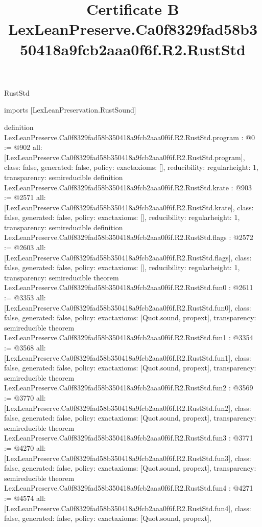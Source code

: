 \begin{lexlean}{RustStd}
\title{Certificate B LexLeanPreserve.Ca0f8329fad58b350418a9fcb2aaa0f6f.R2.RustStd}
\begin{coremodule}
imports [LexLeanPreservation.RustSound]

definition LexLeanPreserve.Ca0f8329fad58b350418a9fcb2aaa0f6f.R2.RustStd.program : @0 := @902 {
  all: [LexLeanPreserve.Ca0f8329fad58b350418a9fcb2aaa0f6f.R2.RustStd.program],
  class: false,
  generated: false,
  policy: exact{axioms: []},
  reducibility: regular{height: 1},
  transparency: semireducible
}
definition LexLeanPreserve.Ca0f8329fad58b350418a9fcb2aaa0f6f.R2.RustStd.krate : @903 := @2571 {
  all: [LexLeanPreserve.Ca0f8329fad58b350418a9fcb2aaa0f6f.R2.RustStd.krate],
  class: false,
  generated: false,
  policy: exact{axioms: []},
  reducibility: regular{height: 1},
  transparency: semireducible
}
definition LexLeanPreserve.Ca0f8329fad58b350418a9fcb2aaa0f6f.R2.RustStd.flags : @2572 := @2603 {
  all: [LexLeanPreserve.Ca0f8329fad58b350418a9fcb2aaa0f6f.R2.RustStd.flags],
  class: false,
  generated: false,
  policy: exact{axioms: []},
  reducibility: regular{height: 1},
  transparency: semireducible
}
theorem LexLeanPreserve.Ca0f8329fad58b350418a9fcb2aaa0f6f.R2.RustStd.fun0 : @2611 := @3353 {
  all: [LexLeanPreserve.Ca0f8329fad58b350418a9fcb2aaa0f6f.R2.RustStd.fun0],
  class: false,
  generated: false,
  policy: exact{axioms: [Quot.sound, propext]},
  transparency: semireducible
}
theorem LexLeanPreserve.Ca0f8329fad58b350418a9fcb2aaa0f6f.R2.RustStd.fun1 : @3354 := @3568 {
  all: [LexLeanPreserve.Ca0f8329fad58b350418a9fcb2aaa0f6f.R2.RustStd.fun1],
  class: false,
  generated: false,
  policy: exact{axioms: [Quot.sound, propext]},
  transparency: semireducible
}
theorem LexLeanPreserve.Ca0f8329fad58b350418a9fcb2aaa0f6f.R2.RustStd.fun2 : @3569 := @3770 {
  all: [LexLeanPreserve.Ca0f8329fad58b350418a9fcb2aaa0f6f.R2.RustStd.fun2],
  class: false,
  generated: false,
  policy: exact{axioms: [Quot.sound, propext]},
  transparency: semireducible
}
theorem LexLeanPreserve.Ca0f8329fad58b350418a9fcb2aaa0f6f.R2.RustStd.fun3 : @3771 := @4270 {
  all: [LexLeanPreserve.Ca0f8329fad58b350418a9fcb2aaa0f6f.R2.RustStd.fun3],
  class: false,
  generated: false,
  policy: exact{axioms: [Quot.sound, propext]},
  transparency: semireducible
}
theorem LexLeanPreserve.Ca0f8329fad58b350418a9fcb2aaa0f6f.R2.RustStd.fun4 : @4271 := @4574 {
  all: [LexLeanPreserve.Ca0f8329fad58b350418a9fcb2aaa0f6f.R2.RustStd.fun4],
  class: false,
  generated: false,
  policy: exact{axioms: [Quot.sound, propext]},
}
\end{coremodule}
\end{lexlean}
